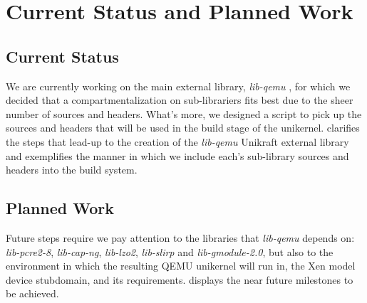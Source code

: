 \chapter{Current Status and Planned Work}
\label{chapter:status-planned-work}

\section{Current Status}
\label{sec:current-status}

We are currently working on the main external library, \textit{lib-qemu} \cite{lib-qemu}, for which we decided that a compartmentalization on sub-librariers fits best due to the sheer number of sources and headers.
What's more, we designed a script to pick up the sources and headers that will be used in the build stage of the unikernel.
 clarifies the steps that lead-up to the creation of the \textit{lib-qemu} Unikraft external library and  exemplifies the manner in which we include each's sub-library sources and headers into the build system.


\section{Planned Work}
\label{sec:planned work}

Future steps require we pay attention to the libraries that \textit{lib-qemu} depends on: \textit{lib-pcre2-8}, \textit{lib-cap-ng}, \textit{lib-lzo2}, \textit{lib-slirp} and \textit{lib-gmodule-2.0}, but also to the environment in which the resulting QEMU unikernel will run in, the Xen model device stubdomain, and its requirements.
 displays the near future milestones to be achieved.
